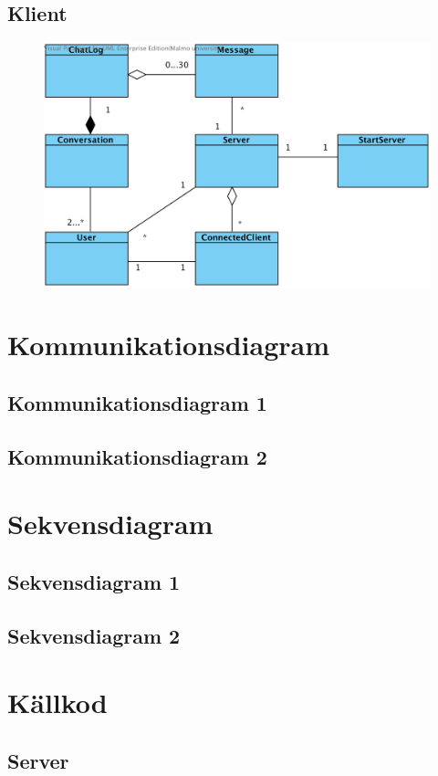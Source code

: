 \documentclass[a4paper,11pt]{article}
\begin{document}
\subsection{Klient}
	\begin{figure}[H]
		\centering
		\includegraphics[width=\textwidth]{diagram/Server.png}
	\end{figure}
\section{Kommunikationsdiagram}
\subsection{Kommunikationsdiagram 1}
\subsection{Kommunikationsdiagram 2}
\section{Sekvensdiagram}
\subsection{Sekvensdiagram 1}
\subsection{Sekvensdiagram 2}

\section{Källkod}

	\subsection{Server}
\end{document}
